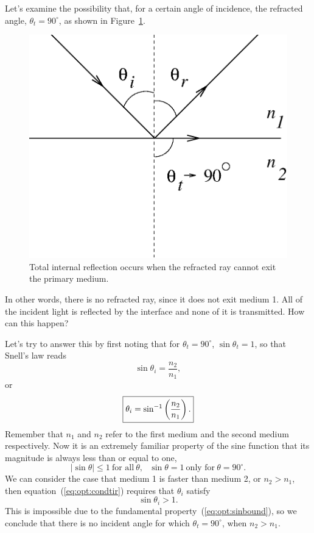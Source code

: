 Let's examine the possibility that, for a certain angle of incidence, the 
refracted angle, $\theta_t=90^\circ$, as shown in 
Figure~\ref{fig:opt:totintref}.
\begin{figure}[htb]
\centering 
\epsfxsize=6cm \includegraphics[scale=0.6]{8_refraction/totintref.eps}
\caption{Total internal reflection occurs when the refracted ray cannot exit
the primary medium.}
\label{fig:opt:totintref}
\end{figure}
In other words, there is no refracted ray, since it does not exit medium 1.
All of the incident light is reflected by the interface and none of it is
transmitted. How can this happen?

Let's try to answer this by first noting that for $\theta_t=90^\circ$,
$\sin\theta_t=1$, so that Snell's law reads
\begin{equation}
\sin\theta_i=\frac{n_2}{n_1},  \label{eq:opt:condtir}
\end{equation}
or 
$$
\fbox{$ \displaystyle \theta_i=\sin^{-1}\left(\frac{n_2}{n_1}\right). $} 
$$
Remember that $n_1$ and $n_2$ refer to the first medium
and the second medium respectively.  
Now it is an extremely familiar property of the sine function that its 
magnitude is always less than or equal to one,
\begin{equation}
|\sin\theta| \leq 1 ~\mbox{for all}~\theta, 
~~~\sin\theta=1 ~\mbox{only for}~\theta=90^\circ.  \label{eq:opt:sinbound}
\end{equation}
We can consider the case that medium 1 is faster than medium 2, or $n_2>n_1$,
then equation~(\ref{eq:opt:condtir}) requires that $\theta_i$ satisfy
$$
\sin\theta_i >1.
$$ 
This is impossible due to the fundamental property~(\ref{eq:opt:sinbound}),
so we conclude that there is no incident angle for which $\theta_t=90^\circ$,
when $n_2>n_1$.
 
